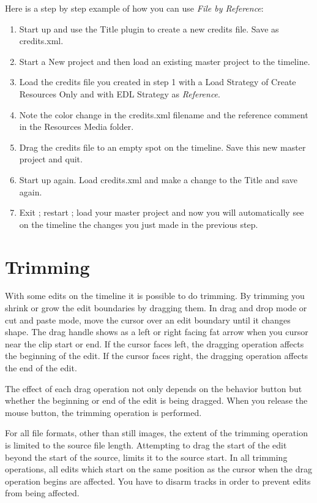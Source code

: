 Here is a step by step example of how you can use \textit{File by
	Reference}:
\begin{enumerate}
	\item Start up \CGG{} and use the Title plugin to create a new
	credits file.  Save as credits.xml.
	\item Start a New project and then load an existing master
	project to the timeline.
	\item Load the credits file you created in step 1 with a Load
	Strategy of Create Resources Only and with EDL Strategy as
	\textit{Reference}.
	\item Note the color change in the credits.xml filename and the
	reference comment in the Resources Media folder.
	\item Drag the credits file to an empty spot on the timeline.
	Save this new master project and quit.
	\item Start \CGG{} up again.  Load credits.xml and make a change
	to the Title and save again.
	\item Exit \CGG{}; restart \CGG{}; load your master project and
	now you will automatically see on the timeline the changes you just
	made in the previous step.
\end{enumerate}

\section{Trimming}%
\label{sec:trimming}

With some edits on the timeline it is possible to do trimming. By
trimming you shrink or grow the edit boundaries by dragging them. In
drag and drop mode or cut and paste mode, move the cursor over an
edit boundary until it changes shape. The drag handle shows as a
left or right facing fat arrow when you cursor near the clip start
or end.  If the cursor faces left, the dragging operation affects
the beginning of the edit. If the cursor faces right, the dragging
operation affects the end of the edit.

The effect of each drag operation not only depends on the behavior
button but whether the beginning or end of the edit is being
dragged. When you release the mouse button, the trimming operation
is performed.

For all file formats, other than still images, the extent of the
trimming operation is limited to the source file length. Attempting
to drag the start of the edit beyond the start of the source, limits
it to the source start. In all trimming operations, all edits which
start on the same position as the cursor when the drag operation
begins are affected. You have to disarm tracks in order to prevent
edits from being affected.

